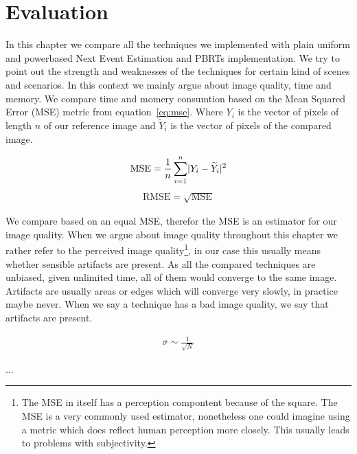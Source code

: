 \chapter{Evaluation}
\label{ch:Evaluation}
In this chapter we compare all the techniques we implemented with plain uniform and powerbased Next Event Estimation and PBRTs implementation. We try to point out the strength and weaknesses of the techniques for certain kind of scenes and scenarios. In this context we mainly argue about image quality, time and memory. We compare time and momery consumtion based on the Mean Squared Error (MSE) metric from equation~\ref{eq:mse}. Where $Y_i$ is the vector of pixels of length $n$ of our reference image and $\widetilde{Y}_i$ is the vector of pixels of the compared image. 

\begin{align}\label{eq:mse}
\text{MSE} = \frac{1}{n}\sum_{i=1}^{n}\lvert Y_i - \widetilde{Y}_i\rvert^2
\end{align}
\begin{align}\label{eq:rmse}
\text{RMSE} = \sqrt{\text{MSE}}
\end{align}


We compare based on an equal MSE, therefor the MSE is an estimator for our image quality. When we argue about image quality throughout this chapter we rather refer to the perceived image quality\footnote{The MSE in itself has a perception compontent because of the square. The MSE is a very commonly used estimator, nonetheless one could imagine using a metric which does reflect human perception more closely. This usually leads to problems with subjectivity.}, in our case this usually means whether sensible artifacts are present. As all the compared techniques are unbiased, given unlimited time, all of them would converge to the same image. Artifacts are usually areas or edges which will converge very slowly, in practice maybe never. When we say a technique has a bad image quality, we say that artifacts are present. 

\begin{align}\label{eq:sigmaCor}
\sigma \sim \frac{1}{\sqrt{N}}
\end{align}

...

